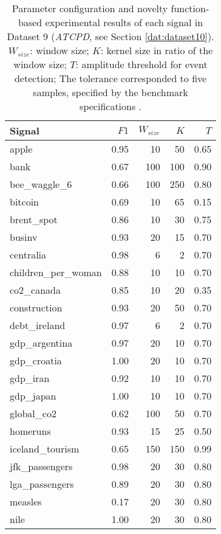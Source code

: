 \begin{table}
\centering
    \caption{Parameter configuration and novelty function-based experimental results of each signal in Dataset 9 (\textit{ATCPD}, see Section \ref{dat:dataset10}). $W_{size}$: window size; $K$: kernel size in ratio of the window size; $T$: amplitude threshold for event detection; The tolerance corresponded to five samples, specified by the benchmark specifications \cite{cpd_alan}.}
    \label{tab:params_results_alanT}
    \begin{tabular}{lrrrr}
    \toprule
    Signal &     $F1$ &    $W_{size}$ &    $K$ &     $T$\\
    \midrule
    apple &  0.95 &   10 &   50 &  0.65 \\
    bank &  0.67 &  100 &  100 &  0.90 \\
    bee\_waggle\_6 &  0.66 &  100 &  250 &  0.80 \\
    bitcoin &  0.69 &   10 &   65 &  0.15 \\
    brent\_spot &  0.86 &   10 &   30 &  0.75 \\
    businv &  0.93 &   20 &   15 &  0.70 \\
    centralia &  0.98 &    6 &    2 &  0.70 \\
    children\_per\_woman &  0.88 &   10 &   10 &  0.70 \\
    co2\_canada &  0.85 &   10 &   20 &  0.35 \\
    construction &  0.93 &   20 &   50 &  0.70 \\
    debt\_ireland &  0.97 &    6 &    2 &  0.70 \\
    gdp\_argentina &  0.97 &   20 &   10 &  0.70 \\
    gdp\_croatia &  1.00 &   20 &   10 &  0.70 \\
    gdp\_iran &  0.92 &   10 &   10 &  0.70 \\
    gdp\_japan &  1.00 &   10 &   10 &  0.70 \\
    global\_co2 &  0.62 &  100 &   50 &  0.70 \\
    homeruns &  0.93 &   15 &   25 &  0.50 \\
    iceland\_tourism &  0.65 &  150 &  150 &  0.99 \\
    jfk\_passengers &  0.98 &   20 &   30 &  0.80 \\
    lga\_passengers &  0.89 &   20 &   30 &  0.80 \\
    measles &  0.17 &   20 &   30 &  0.80 \\
    nile &  1.00 &   20 &   30 &  0.80 \\

\end{tabular}
\end{table}
